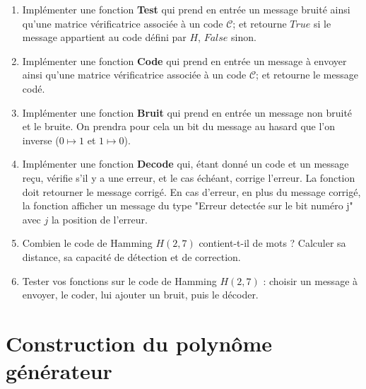 \begin{enumerate}
\item Implémenter une fonction \textbf{Test} qui prend en entrée un message bruité ainsi qu'une matrice vérificatrice associée à un code $\mathcal C$; et retourne $True$ si le message appartient au code défini par $H$, $False$ sinon.
\item Implémenter une fonction \textbf{Code} qui prend en entrée un message à envoyer ainsi qu'une matrice vérificatrice associée à un code $\mathcal C$; et retourne le message codé.
\item Implémenter une fonction \textbf{Bruit} qui prend en entrée un message non bruité et le bruite. On prendra pour cela un bit du message au hasard que l'on inverse ($0\mapsto 1$ et $1\mapsto 0$).
\item Implémenter une fonction \textbf{Decode} qui, étant donné un code et un message reçu, vérifie s'il y a une erreur, et le cas échéant, corrige l'erreur. La fonction doit retourner le message corrigé. En cas d'erreur, en plus du message corrigé, la fonction afficher un message du type "Erreur detectée sur le bit numéro j" avec $j$ la position de l'erreur.
\item Combien le code de Hamming $H(2,7)$ contient-t-il de mots ? Calculer sa distance, sa capacité de détection et de correction.
\item Tester vos fonctions sur le code de Hamming $H(2,7)$ : choisir un message à envoyer, le coder, lui ajouter un bruit, puis le décoder.
\end{enumerate}

\section{Construction du polynôme générateur}

\\
\\

